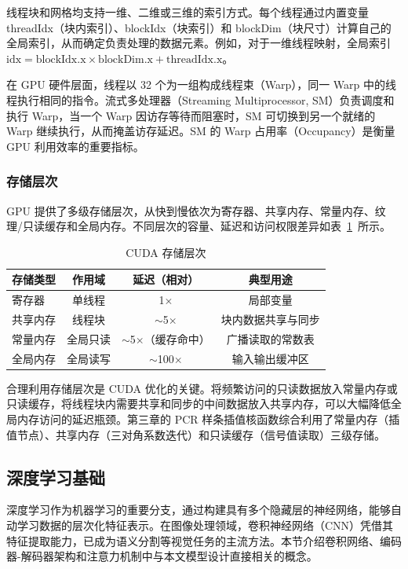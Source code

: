 线程块和网格均支持一维、二维或三维的索引方式。每个线程通过内置变量 threadIdx（块内索引）、blockIdx（块索引）和 blockDim（块尺寸）计算自己的全局索引，从而确定负责处理的数据元素。例如，对于一维线程映射，全局索引 $\text{idx} = \text{blockIdx.x} \times \text{blockDim.x} + \text{threadIdx.x}$。

在 GPU 硬件层面，线程以 32 个为一组构成线程束（Warp），同一 Warp 中的线程执行相同的指令。流式多处理器（Streaming Multiprocessor, SM）负责调度和执行 Warp，当一个 Warp 因访存等待而阻塞时，SM 可切换到另一个就绪的 Warp 继续执行，从而掩盖访存延迟。SM 的 Warp 占用率（Occupancy）是衡量 GPU 利用效率的重要指标。

\subsubsection{存储层次}

GPU 提供了多级存储层次，从快到慢依次为寄存器、共享内存、常量内存、纹理/只读缓存和全局内存。不同层次的容量、延迟和访问权限差异如表~\ref{tab:cuda_memory}~所示。

\begin{table}[htbp]
\centering
\caption{CUDA 存储层次}
\label{tab:cuda_memory}
\begin{tabular}{lccc}
\toprule
存储类型 & 作用域 & 延迟（相对） & 典型用途 \\
\midrule
寄存器 & 单线程 & 1$\times$ & 局部变量 \\
共享内存 & 线程块 & $\sim$5$\times$ & 块内数据共享与同步 \\
常量内存 & 全局只读 & $\sim$5$\times$（缓存命中） & 广播读取的常数表 \\
全局内存 & 全局读写 & $\sim$100$\times$ & 输入输出缓冲区 \\
\bottomrule
\end{tabular}
\end{table}

合理利用存储层次是 CUDA 优化的关键。将频繁访问的只读数据放入常量内存或只读缓存，将线程块内需要共享和同步的中间数据放入共享内存，可以大幅降低全局内存访问的延迟瓶颈。第三章的 PCR 样条插值核函数综合利用了常量内存（插值节点）、共享内存（三对角系数迭代）和只读缓存（信号值读取）三级存储。

\subsection{深度学习基础}

深度学习作为机器学习的重要分支，通过构建具有多个隐藏层的神经网络，能够自动学习数据的层次化特征表示。在图像处理领域，卷积神经网络（CNN）凭借其特征提取能力，已成为语义分割等视觉任务的主流方法。本节介绍卷积网络、编码器-解码器架构和注意力机制中与本文模型设计直接相关的概念。

